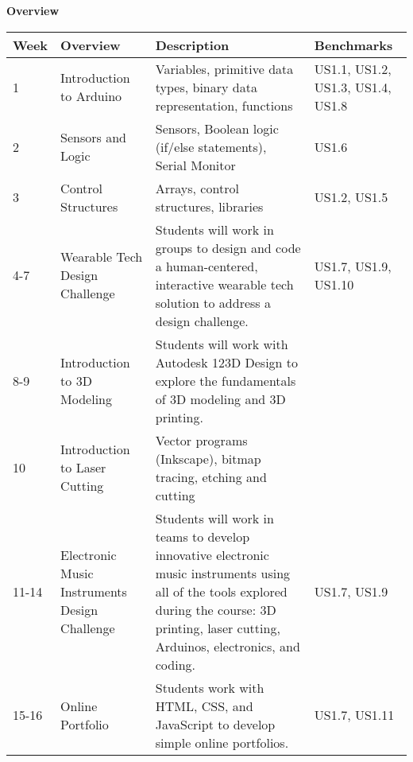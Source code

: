 \textbf{Overview}

\begin{longtable}{|p{1.8cm} | p{4cm} | p{6cm}|p{2cm}|}
	\hline
\textbf{Week} & \textbf{Overview}     & \textbf{Description}        & \textbf{Benchmarks}    \\ \hline
1             & Introduction to Arduino                       & Variables, primitive data types, binary data representation, functions                                                                                                                           & US1.1, US1.2, US1.3, US1.4, US1.8 \\ \hline
2             & Sensors and Logic                             & Sensors, Boolean logic (if/else statements), Serial Monitor                                                                                                                                      & US1.6                             \\ \hline
3             & Control Structures                            & Arrays, control structures, libraries                                                                                                                                                            & US1.2, US1.5                      \\ \hline
4-7      & Wearable Tech Design Challenge                & Students will work in groups to design and code a human-centered, interactive wearable tech solution to address a design challenge.                                                              & US1.7, US1.9, US1.10              \\ \hline
8-9     & Introduction to 3D Modeling                   & Students will work with Autodesk 123D Design to explore the fundamentals of 3D modeling and 3D printing.                                                                                         &                                  \\ \hline
10            & Introduction to Laser Cutting                 & Vector programs (Inkscape), bitmap tracing, etching and cutting                                                                                                                                  &                                 \\ \hline
11-14    & Electronic Music Instruments Design Challenge & Students will work in teams to develop innovative electronic music instruments using all of the tools explored during the course: 3D printing, laser cutting, Arduinos, electronics, and coding. & US1.7, US1.9                      \\ \hline
15-16         & Online Portfolio                              & Students work with HTML, CSS, and JavaScript to develop simple online portfolios.     & US1.7, US1.11                     \\ \hline
\end{longtable}

